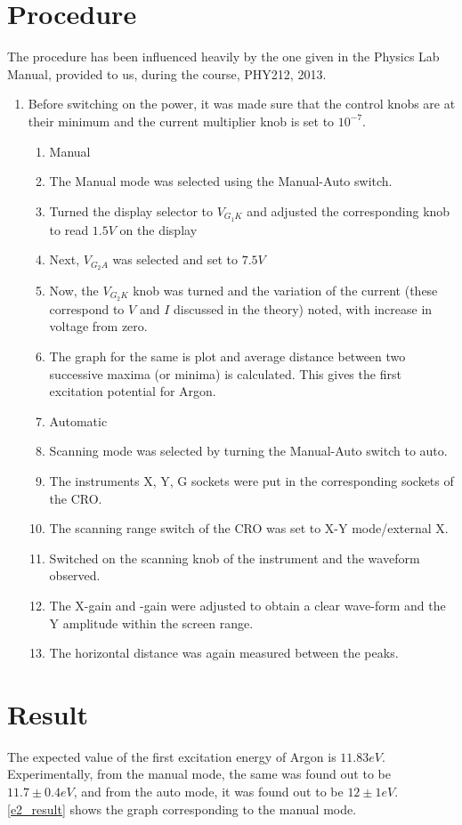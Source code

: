\section{Procedure}
	The procedure has been influenced heavily by the one given in the Physics Lab Manual, provided to us, during the course, PHY212, 2013.
	\begin{enumerate}
		\item Before switching on the power, it was made sure that the control knobs are at their minimum and the current multiplier knob is set to $10^{-7}$.
		\begin{enumerate}
		\item Manual
			\item The Manual mode was selected using the Manual-Auto switch.
			\item Turned the display selector to $V_{G_1K}$ and adjusted the corresponding knob to read $1.5V$ on the display
			\item Next, $V_{G_2A}$ was selected and set to $7.5V$
			\item Now, the $V_{G_2K}$ knob was turned and the variation of the current (these correspond to $V$ and $I$ discussed in the theory) noted, with increase in voltage from zero.
			\item The graph for the same is plot and average distance between two successive maxima (or minima) is calculated. This gives the first excitation potential for Argon.
		\item Automatic
			\item Scanning mode was selected by turning the Manual-Auto switch to auto.
			\item The instruments X, Y, G sockets were put in the corresponding sockets of the CRO.
			\item The scanning range switch of the CRO was set to X-Y mode/external X.
			\item Switched on the scanning knob of the instrument and the waveform observed.
			\item The X-gain and -gain were adjusted to obtain a clear wave-form and the Y amplitude within the screen range.
			\item The horizontal distance was again measured between the peaks.
		\end{enumerate}
	\end{enumerate}

\section{Result}
	The expected value of the first excitation energy of Argon is $11.83 eV$. Experimentally, from the manual mode, the same was found out to be $11.7 \pm 0.4 eV$, and from the auto mode, it was found out to be $12 \pm 1 eV$. \autoref{e2_result} shows the graph corresponding to the manual mode.